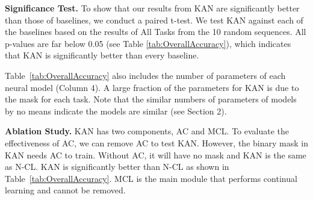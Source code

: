 \documentclass[runningheads]{llncs}
\begin{document}
\textbf{Significance Test.} To show that our results from KAN are significantly better than those of baselines, we conduct a paired t-test. We test KAN against each of the baselines based on the results of All Tasks from the 10 random sequences. All p-values are far below {\color{black}0.05} (see Table \ref{tab:OverallAccuracy}), which indicates that KAN is significantly better than every baseline. 


Table~\ref{tab:OverallAccuracy} also includes the number of parameters of each neural model (Column 4). A large fraction of the parameters for KAN is due to the mask for each task. Note that the similar numbers of parameters of models by no means indicate the models are similar (see Section 2). 

\textbf{Ablation Study.} KAN has two components, AC and MCL. To evaluate the effectiveness of AC, we can remove AC to test KAN. However, the binary mask in KAN needs AC to train. Without AC, it will have no mask and KAN is the same {\color{black}as} N-CL. KAN is significantly better than N-CL as shown in Table~\ref{tab:OverallAccuracy}. MCL is the main module that performs continual learning and cannot be removed.
\end{document}
